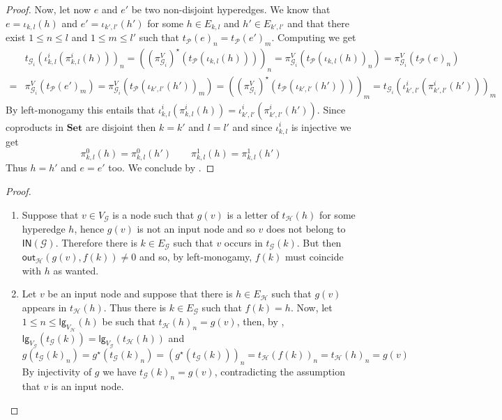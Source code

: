 \documentclass[3p]{elsarticle}
\newcommand{\lgh}{\mathsf{lg}}
\newcommand{\ino}[1]{\mathsf{IN}({\mathcal{#1}})}
\newcommand{\outd}[1]{\mathsf{out}_{\mathcal{#1}}}
\newcommand{\Set}{\mathbf{Set}}
\theoremstyle{remark}
\theoremstyle{definition}
\begin{document}
\begin{proof}
	Now, let now $e$ and $e'$ be two non-disjoint hyperedges. We know that $e=\iota_{k,l}(h)$ and $e'=\iota_{k',l'}(h')$ for some $h\in E_{k,l}$ and $h'\in E_{k', l'}$ and that there exist $1\leq n \leq l$ and $1\leq m \leq l'$ such that $t_{\mathcal{P}}(e)_n =t_{\mathcal{P}}(e')_m$.
	Computing we get
\begin{align*}
& t_{\mathcal{G}_i}( \iota^i_{k,l}(\pi^i_{k,l}(h)))_n = ((\pi^V_{\mathcal{G}_i})^\star(t_{\mathcal{P}}(\iota_{k,l }(h))))_n= \pi^V_{\mathcal{G}_i}(t_{\mathcal{P}}(\iota_{k,l }(h))_n)=  \pi^V_{\mathcal{G}_i}(t_{\mathcal{P}}(e)_n)\\ =& \pi^V_{\mathcal{G}_i}(t_{\mathcal{P}}(e')_m)=\pi^V_{\mathcal{G}_i}(t_{\mathcal{P}}(\iota_{k',l' }(h'))_m) =((\pi^V_{\mathcal{G}_i})^\star(t_{\mathcal{P}}(\iota_{k',l' }(h'))))_m = t_{\mathcal{G}_i}( \iota^i_{k',l'}(\pi^i_{k',l'}(h')))_m
\end{align*}
	By left-monogamy this entails that $\iota^i_{k,l}(\pi^i_{k,l}(h)) = \iota^i_{k',l'}(\pi^i_{k',l'}(h'))$. Since coproducts in $\Set$ are disjoint then $k= k'$ and $l=l'$ and since $\iota^i_{k,l}$ is injective we get
	\[\pi^0_{k,l}(h)= \pi^0_{k,l}(h') \qquad \pi^1_{k,l}(h)= \pi^1_{k,l}(h')\]
	Thus $h=h'$ and $e =e'$ too. We conclude by .
\end{proof}

\inp*
\begin{proof}\label{proof:inp}
	\begin{enumerate}
		\item Suppose that $v\in V_{\mathcal{G}}$ is a node such that $g(v)$ is a letter of $t_{\mathcal{H}}(h)$ for some hyperedge $h$, hence $g(v)$ is not an input node and so $v$ does not belong to $\ino{G}$. Therefore there is $k\in E_{\mathcal{G}}$ such that $v$ occurs in $t_{\mathcal{G}}(k)$. But then $\outd{H}(g(v), f(k))\neq 0$ and so, by left-monogamy, $f(k)$ must coincide with $h$ as wanted.
		\item  Let $v$ be an input node and suppose that there is $h\in E_{\mathcal{H}}$ such that $g(v)$ appears in $t_{\mathcal{H}}(h)$. Thus there is $k\in E_{\mathcal{G}}$ such that $f(k)=h$. Now, let $1\leq n\leq \lgh_{V_{\mathcal{H}}}(h)$ be such that $t_{\mathcal{H}}(h)_n=g(v)$, then, by , $\lgh_{V_{\mathcal{G}}}(t_{\mathcal{G}}(k))=\lgh_{V_{\mathcal{G}}}(t_{\mathcal{H}}(h))$ and
		\[g(t_{\mathcal{G}}(k)_n)=g^\star(t_{\mathcal{G}}(k)_n)=(g^\star(t_{\mathcal{G}}(k)))_n=t_{\mathcal{H}}(f(k))_n = t_{\mathcal{H}}(h)_n=g(v)\]
		By injectivity of $g$ we have $t_{\mathcal{G}}(k)_n=g(v)$, contradicting the assumption that $v$ is an input node.	  \qedhere 
	\end{enumerate}
\end{proof}
\end{document}
